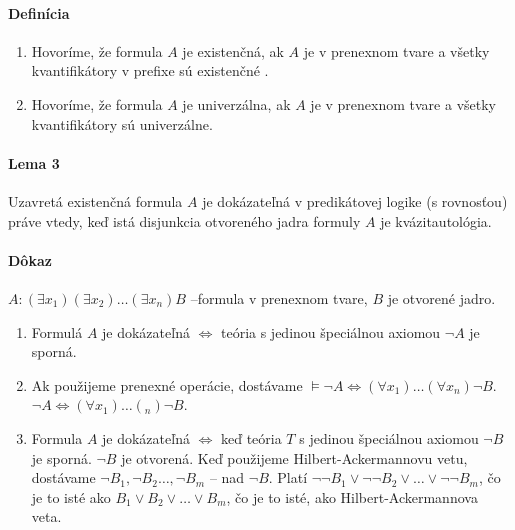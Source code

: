 \paragraph{Definícia} 
\begin{enumerate}
\item
Hovoríme, že formula $A$ je existenčná, ak $A$ je v
prenexnom tvare a všetky kvantifikátory v prefixe sú existenčné .
\item Hovoríme, že formula $A$ je univerzálna, ak $A$ je v prenexnom tvare a
všetky kvantifikátory sú univerzálne.

\end{enumerate}

\paragraph{Lema 3} Uzavretá existenčná formula $A$ je dokázateľná v predikátovej
logike (s rovnosťou) práve vtedy, keď istá disjunkcia otvoreného jadra formuly
$A$ je kvázitautológia.

\paragraph{Dôkaz} $A: (\exists x_1)(\exists x_2) \ldots (\exists x_n)B$
--formula v prenexnom tvare, $B$ je otvorené jadro. 

\begin{enumerate}
	\item Formulá $A$ je dokázateľná $\iff$ teória s jedinou špeciálnou
	axiomou $\neg A$ je sporná.
	\item Ak použijeme prenexné operácie, dostávame $\models \neg A \iff
	(\forall x_1)\ldots (\forall x_n) \neg B$. $\neg A \iff (\forall x_1)
	\ldots  (_n) \neg B$.

	\item Formula $A$ je dokázateľná $\iff$ keď teória $T$ s jedinou
	špeciálnou axiomou $\neg B$ je sporná. $\neg B$ je otvorená. Keď
	použijeme Hilbert-Ackermannovu vetu, dostávame $\neg B_1, \neg B_2
	\ldots, \neg B_m$ -- nad $\neg B$. Platí $\neg \neg B_1 \lor \neg \neg
	B_2 \lor \ldots \lor \neg \neg B_m$, čo je to isté ako $B_1 \lor B_2
	\lor \ldots \lor B_m$, čo je to isté, ako Hilbert-Ackermannova veta.
\end{enumerate}


